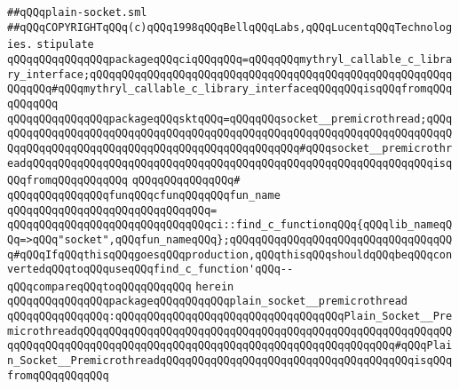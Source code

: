 \label{src/lib/std/src/socket/win32-plain-socket.pkg}
\verb|##qQQqplain-socket.sml|\newline
\verb|##qQQqCOPYRIGHTqQQq(c)qQQq1998qQQqBellqQQqLabs,qQQqLucentqQQqTechnologies.|\newline
\newline
\verb|stipulate|\newline
\verb|qQQqqQQqqQQqqQQqpackageqQQqciqQQqqQQq=qQQqqQQqmythryl_callable_c_library_interface;qQQqqQQqqQQqqQQqqQQqqQQqqQQqqQQqqQQqqQQqqQQqqQQqqQQqqQQqqQQqqQQq#qQQqmythryl_callable_c_library_interfaceqQQqqQQqisqQQqfromqQQqqQQqqQQq|\newline
\verb|qQQqqQQqqQQqqQQqpackageqQQqsktqQQq=qQQqqQQqsocket__premicrothread;qQQqqQQqqQQqqQQqqQQqqQQqqQQqqQQqqQQqqQQqqQQqqQQqqQQqqQQqqQQqqQQqqQQqqQQqqQQqqQQqqQQqqQQqqQQqqQQqqQQqqQQqqQQqqQQqqQQqqQQq#qQQqsocket__premicrothreadqQQqqQQqqQQqqQQqqQQqqQQqqQQqqQQqqQQqqQQqqQQqqQQqqQQqqQQqqQQqqQQqisqQQqfromqQQqqQQqqQQq|\newline
\verb|qQQqqQQqqQQqqQQq#|\newline
\verb|qQQqqQQqqQQqqQQqfunqQQqcfunqQQqqQQqfun_name|\newline
\verb|qQQqqQQqqQQqqQQqqQQqqQQqqQQqqQQq=|\newline
\verb|qQQqqQQqqQQqqQQqqQQqqQQqqQQqqQQqci::find_c_functionqQQq{qQQqlib_nameqQQq=>qQQq"socket",qQQqfun_nameqQQq};qQQqqQQqqQQqqQQqqQQqqQQqqQQqqQQqqQQq#qQQqIfqQQqthisqQQqgoesqQQqproduction,qQQqthisqQQqshouldqQQqbeqQQqconvertedqQQqtoqQQquseqQQqfind_c_function'qQQq--qQQqcompareqQQqtoqQQqqQQqqQQq|\newline
\verb|herein|\newline
\newline
\verb|qQQqqQQqqQQqqQQqpackageqQQqqQQqqQQqplain_socket__premicrothread|\newline
\verb|qQQqqQQqqQQqqQQq:qQQqqQQqqQQqqQQqqQQqqQQqqQQqqQQqqQQqPlain_Socket__PremicrothreadqQQqqQQqqQQqqQQqqQQqqQQqqQQqqQQqqQQqqQQqqQQqqQQqqQQqqQQqqQQqqQQqqQQqqQQqqQQqqQQqqQQqqQQqqQQqqQQqqQQqqQQqqQQqqQQqqQQqqQQq#qQQqPlain_Socket__PremicrothreadqQQqqQQqqQQqqQQqqQQqqQQqqQQqqQQqqQQqqQQqisqQQqfromqQQqqQQqqQQq|\newline

